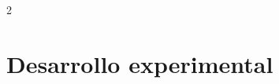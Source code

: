 \documentclass[11pt, letterpaper]{article}
\begin{document}
\begin{multicols*}{2}



\section{Desarrollo experimental}


\end{multicols*}
\end{document}

